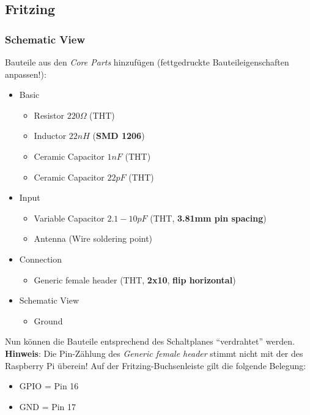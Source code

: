 \subsection*{Fritzing}

\subsubsection{Schematic View}

Bauteile aus den \emph{Core Parts} hinzufügen (fettgedruckte Bauteileigenschaften anpassen!):

\begin{itemize}
    \item  Basic
    \begin{itemize}
        \item Resistor $220 \Omega$ (THT)
        \item Inductor $22 nH$ (\textbf{SMD 1206})
        \item Ceramic Capacitor $1 nF$ (THT)
        \item Ceramic Capacitor $22 pF$ (THT)
    \end{itemize}
    \item  Input
    \begin{itemize}
        \item Variable Capacitor $2.1-10 pF$ (THT, \textbf{3.81mm pin spacing})
        \item Antenna (Wire soldering point)
    \end{itemize}
    \item Connection
    \begin{itemize}
        \item Generic female header (THT, \textbf{2x10}, \textbf{flip horizontal})
    \end{itemize}
    \item Schematic View
    \begin{itemize}
        \item Ground
    \end{itemize}
\end{itemize}

Nun können die Bauteile entsprechend des Schaltplanes "`verdrahtet"' werden.
\textbf{Hinweis}: Die Pin-Zählung des \emph{Generic female header} stimmt nicht
mit der des Raspberry Pi überein! Auf der Fritzing-Buchsenleiste gilt die
folgende Belegung:

\begin{itemize}
    \item GPIO = Pin 16
    \item GND = Pin 17
\end{itemize}

